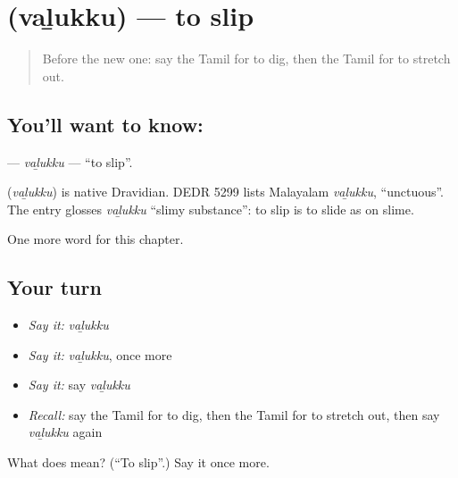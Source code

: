 \section[\texorpdfstring{\ta{வழுக்கு} (vaḻukku)}{வழுக்கு (vaḻukku)}]{ (vaḻukku) — to slip}

\label{lesson:TA-C168-valukku}



\begin{quote}
Before the new one: say the Tamil for to dig, then the Tamil for to stretch out.
\end{quote}

\subsection*{You'll want to know: }
\textbf{} — \emph{vaḻukku} — \textquotedblleft{}to slip\textquotedblright{}.

\begin{cousinweb}
\textbf{} (\emph{vaḻukku}) is native Dravidian. DEDR 5299 lists Malayalam \emph{vaḻukku}, \textquotedblleft{}unctuous\textquotedblright{}. The entry glosses \emph{vaḻukku} \textquotedblleft{}slimy substance\textquotedblright{}: to slip is to slide as on slime.
\end{cousinweb}

\begin{grammarlens}[title={What you've built}]
One more word for this chapter.
\end{grammarlens}

\subsection*{Your turn}
\begin{itemize}
\raggedright
  \item \emph{Say it:} \emph{vaḻukku}
  \item \emph{Say it:} \emph{vaḻukku}, once more
  \item \emph{Say it:} say \emph{vaḻukku}
  \item \emph{Recall:} say the Tamil for to dig, then the Tamil for to stretch out, then say \emph{vaḻukku} again
\end{itemize}

\begin{tcolorbox}[breakable,colback=teal!4,colframe=teal!35!black,title={Before you move on}]
What does  mean? (\textquotedblleft{}To slip\textquotedblright{}.) Say it once more.
\end{tcolorbox}
